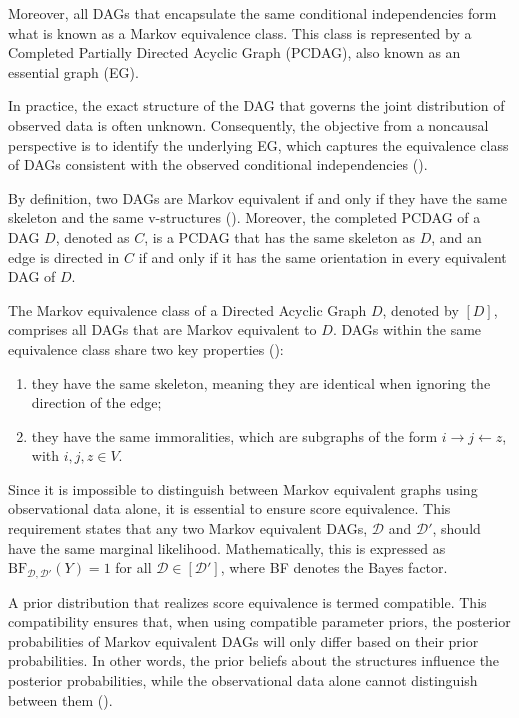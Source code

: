 \documentclass{report}
\begin{document}
Moreover, all DAGs that encapsulate the same conditional independencies form what is known as a Markov equivalence class. This class is represented by a Completed Partially Directed Acyclic Graph (PCDAG), also known as an essential graph (EG). 

In practice, the exact structure of the DAG that governs the joint distribution of observed data is often unknown. Consequently, the objective from a noncausal perspective is to identify the underlying EG, which captures the equivalence class of DAGs consistent with the observed conditional independencies (\citet{castelletti2018learning}). 

By definition, two DAGs are Markov equivalent if and only if they have the same skeleton and the same v-structures (\citet{verma2022equivalence}). 
Moreover, the completed PCDAG of a DAG $\textit{D}$, denoted as $\textit{C}$, is a PCDAG that has the same skeleton as $\textit{D}$, and an edge is directed in $\textit{C}$ if and only if it has the same orientation in every equivalent DAG of $\textit{D}$.

The Markov equivalence class of a Directed Acyclic Graph $D$, denoted by $[D]$, comprises all DAGs that are Markov equivalent to $D$. DAGs within the same equivalence class share two key properties (\citet{peluso2020compatible}):
\begin{enumerate}
	\item they have the same skeleton, meaning they are identical when ignoring the direction of the edge;
	\item they have the same immoralities, which are subgraphs of the form $i \rightarrow j \leftarrow z$, with $i, j, z \in V$.
\end{enumerate}

Since it is impossible to distinguish between Markov equivalent graphs using observational data alone, it is essential to ensure score equivalence. This requirement states that any two Markov equivalent DAGs, $\mathcal{D}$ and $\mathcal{D}'$, should have the same marginal likelihood. Mathematically, this is expressed as $\text{BF}_{\mathcal{D},\mathcal{D}'}(Y) = 1$ for all $\mathcal{D} \in [\mathcal{D}']$, where BF denotes the Bayes factor.

A prior distribution that realizes score equivalence is termed compatible. This compatibility ensures that, when using compatible parameter priors, the posterior probabilities of Markov equivalent DAGs will only differ based on their prior probabilities. In other words, the prior beliefs about the structures influence the posterior probabilities, while the observational data alone cannot distinguish between them (\citet{peluso2020compatible}). 
\end{document}
